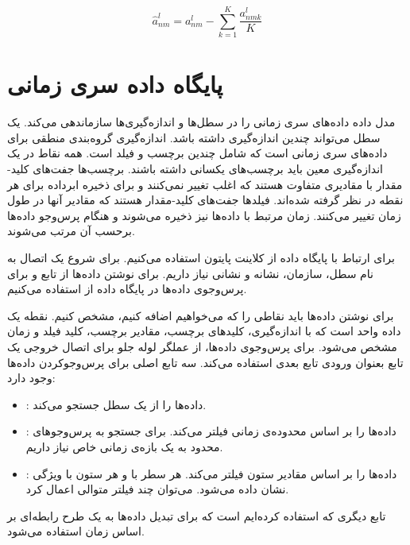 \begin{equation}
\label{form:norm}
\hat{a}^l_{nm}=a^l_{nm}-\sum_{k=1}^K \dfrac{a^l_{nmk}}{K}
\end{equation}

\section{پایگاه داده سری زمانی}

مدل داده  داده‌های سری زمانی را در سطل‌ها و اندازه‌گیری‌ها سازماندهی می‌کند. یک سطل می‌تواند چندین اندازه‌گیری داشته باشد. اندازه‌گیری گروه‌بندی منطقی برای داده‌های سری زمانی است که شامل چندین برچسب و فیلد است. همه نقاط در یک اندازه‌گیری معین باید برچسب‌های یکسانی داشته باشند. برچسب‌ها جفت‌های کلید-مقدار با مقادیری متفاوت هستند که اغلب تغییر نمی‌کنند و برای ذخیره ابرداده برای هر نقطه در نظر گرفته شده‌اند. فیلدها جفت‌های کلید-مقدار هستند که مقادیر آنها در طول زمان تغییر می‌کنند. زمان مرتبط با داده‌ها نیز ذخیره می‌شوند و هنگام پرس‌وجو داده‌ها برحسب آن مرتب می‌شوند\cite{influx_doc}.


برای ارتباط با پایگاه داده از کلاینت پایتون  استفاده می‌کنیم. برای شروع یک اتصال به نام سطل، سازمان، نشانه و نشانی نیاز داریم. برای نوشتن داده‌ها از تابع  و برای پرس‌وجوی داده‌ها در پایگاه داده از  استفاده می‌کنیم.


برای نوشتن داده‌ها باید نقاطی را که می‌خواهیم اضافه کنیم، مشخص کنیم. نقطه یک داده واحد است که با اندازه‌گیری، کلیدهای برچسب، مقادیر برچسب، کلید فیلد و زمان مشخص می‌شود. برای پرس‌وجوی داده‌ها، از عملگر لوله جلو برای اتصال خروجی یک تابع بعنوان ورودی تابع بعدی استفاده می‌کند\cite{influx_doc}. سه تابع اصلی برای پرس‌وجوکردن داده‌ها وجود دارد:

\begin{itemize}
\item {}: داده‌ها را از یک سطل جستجو می‌کند.
\item {}: داده‌ها را بر اساس محدوده‌ی زمانی فیلتر می‌کند. برای جستجو به پرس‌وجوهای محدود به یک بازه‌ی زمانی خاص نیاز داریم.
\item {}: داده‌ها را بر اساس مقادیر ستون فیلتر می‌کند. هر سطر با  و هر ستون با ویژگی  نشان داده می‌شود. می‌توان چند فیلتر متوالی اعمال کرد.
\end{itemize}

تابع دیگری که استفاده کرده‌ایم  است که برای تبدیل داده‌ها به یک طرح رابطه‌ای بر اساس زمان استفاده می‌شود.

